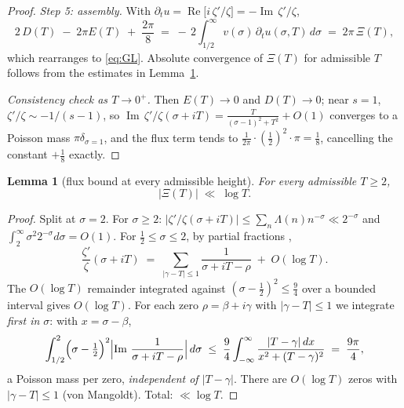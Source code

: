 \documentclass[11pt]{amsart}
\theoremstyle{plain}
\newtheorem{lemma}[theorem]{Lemma}
\theoremstyle{definition}
\theoremstyle{remark}
\renewcommand{\Re}{\operatorname{Re}}
\newcommand{\Imm}{\operatorname{Im}}
\begin{document}
\begin{proof}
\emph{Step 5: assembly.} With $\partial_t u=\Re\bigl[i\,\zeta'/\zeta\bigr]=-\Imm\,\zeta'/\zeta$,
\[
2\,D(T)\;-\;2\pi E(T)\;+\;\frac{2\pi}{8}
\;=\;-\,2\int_{1/2}^\infty v(\sigma)\,\partial_t u(\sigma,T)\,d\sigma
\;=\;2\pi\,\Xi(T),
\]
which rearranges to \eqref{eq:GL}. Absolute convergence of $\Xi(T)$ for admissible $T$ follows from the estimates in Lemma~\ref{lem:flux}.

\emph{Consistency check as $T\to0^+$.} Then $E(T)\to0$ and $D(T)\to0$; near $s=1$, $\zeta'/\zeta\sim-1/(s-1)$, so $\Imm\,\zeta'/\zeta(\sigma+iT)=\frac{T}{(\sigma-1)^2+T^2}+O(1)$ converges to a Poisson mass $\pi\delta_{\sigma=1}$, and the flux term tends to $\frac1{2\pi}\cdot(\tfrac12)^2\cdot\pi=\tfrac18$, cancelling the constant $+\tfrac18$ exactly.
\end{proof}

\begin{lemma}[flux bound at every admissible height]\label{lem:flux}
For every admissible $T\ge2$,
\[
|\Xi(T)|\;\ll\;\log T .
\]
\end{lemma}

\begin{proof}
Split at $\sigma=2$. For $\sigma\ge2$: $|\zeta'/\zeta(\sigma+iT)|\le\sum_n\Lambda(n)n^{-\sigma}\ll2^{-\sigma}$ and $\int_2^\infty\sigma^2 2^{-\sigma}d\sigma=O(1)$. For $\tfrac12\le\sigma\le2$, by partial fractions \cite[Ch.~15--16]{Davenport},
\[
\frac{\zeta'}{\zeta}(\sigma+iT)\;=\;\sum_{|\gamma-T|\le1}\frac{1}{\sigma+iT-\rho}\;+\;O(\log T).
\]
The $O(\log T)$ remainder integrated against $(\sigma-\tfrac12)^2\le\tfrac94$ over a bounded interval gives $O(\log T)$. For each zero $\rho=\beta+i\gamma$ with $|\gamma-T|\le1$ we integrate \emph{first in $\sigma$}: with $x=\sigma-\beta$,
\[
\int_{1/2}^{2}\Bigl(\sigma-\tfrac12\Bigr)^2\Bigl|\Imm\,\frac{1}{\sigma+iT-\rho}\Bigr|\,d\sigma
\;\le\;\frac94\int_{-\infty}^{\infty}\frac{|T-\gamma|\,dx}{x^2+(T-\gamma)^2}\;=\;\frac{9\pi}{4},
\]
a Poisson mass per zero, \emph{independent of $|T-\gamma|$}. There are $O(\log T)$ zeros with $|\gamma-T|\le1$ (von Mangoldt). Total: $\ll\log T$.
\end{proof}
\end{document}
